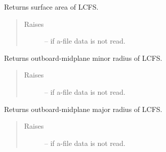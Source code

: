 \documentclass[letterpaper,10pt,english]{sphinxmanual}
\begin{document}
\begin{fulllineitems}
\begin{fulllineitems}
\end{fulllineitems}


\begin{fulllineitems}
\label{eqtools:eqtools.eqdskreader.EqdskReader.getAreaLCFS}
Returns surface area of LCFS.
\begin{quote}\begin{description}
\item[{Raises }] \leavevmode
{} -- 
if a-file data is not read.

\end{description}\end{quote}

\end{fulllineitems}


\begin{fulllineitems}
\label{eqtools:eqtools.eqdskreader.EqdskReader.getAOut}
Returns outboard-midplane minor radius of LCFS.
\begin{quote}\begin{description}
\item[{Raises }] \leavevmode
{} -- 
if a-file data is not read.

\end{description}\end{quote}

\end{fulllineitems}


\begin{fulllineitems}
\label{eqtools:eqtools.eqdskreader.EqdskReader.getRmidOut}
Returns outboard-midplane major radius of LCFS.
\begin{quote}\begin{description}
\item[{Raises }] \leavevmode
{} -- 
if a-file data is not read.

\end{description}\end{quote}


\end{fulllineitems}
\end{fulllineitems}
\end{document}
